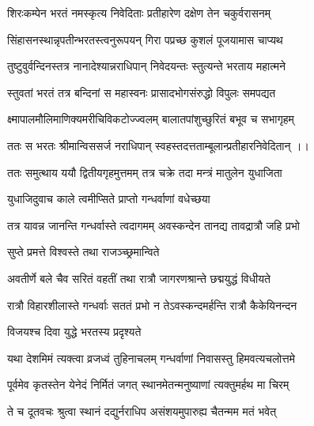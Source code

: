 \twolineshloka
{शिरःकम्पेन भरतं नमस्कृत्य निवेदिताः}
{प्रतीहारेण दक्षेण तेन चकुर्वरासनम्}%

\twolineshloka
{सिंहासनस्थान्नृपतीन्भरतस्त्वनुरूपयन्}
{गिरा पप्रच्छ कुशलं पूजयामास चाप्यथ}%

\twolineshloka
{तुष्टुवुर्वन्दिनस्तत्र नानादेश्यान्नराधिपान्}
{निवेदयन्तः स्तुत्यन्ते भरताय महात्मने}%

\twolineshloka
{स्तुवतां भरतं तत्र बन्दिनां स महास्वनः}
{प्रासादभोगसंरुद्धो विपुलः समपद्यत}%

\twolineshloka
{क्ष्मापालमौलिमाणिक्यमरीचिविकटोज्ज्वलम्}
{बालातपांशुच्छुरितं बभूव च सभागृहम्}%

\twolineshloka
{ततः स भरतः श्रीमान्विससर्ज नराधिपान्}
{स्वहस्तदत्तताम्बूलान्प्रतीहारनिवेदितान् ।।}%

\twolineshloka
{ततः समुत्थाय ययौ द्वितीयगृहमुत्तमम्}
{तत्र चक्रे तदा मन्त्रं मातुलेन युधाजिता}%


{युधाजिदुवाच}
\onelineshloka
{काले त्वमीप्सिते प्राप्तो गन्धर्वाणां वधेच्छया}%

\twolineshloka
{तत्र यावन्न जानन्ति गन्धर्वास्ते त्वदागमम्}
{अवस्कन्देन तानद्य तावद्रात्रौ जहि प्रभो}%



\onelineshloka
{सुप्ते प्रमत्ते विश्वस्ते तथा राजञ्च्छ्रमान्विते}%

\twolineshloka
{अवतीर्णे बले चैव सरितं वहतीं तथा}
{रात्रौ जागरणश्रान्ते छद्मयुद्धं विधीयते}%

\twolineshloka
{रात्रौ विहारशीलास्ते गन्धर्वाः सततं प्रभो}
{न तेऽवस्कन्दमर्हन्ति रात्रौ कैकेयिनन्दन}%

\onelineshloka
{विजयश्च दिवा युद्धे भरतस्य प्रदृश्यते}



\twolineshloka
{यथा देशमिमं त्यक्त्वा व्रजध्वं तुहिनाचलम्}
{गन्धर्वाणां निवासस्तु हिमवत्यचलोत्तमे}%

\twolineshloka
{पूर्वमेव कृतस्तेन येनेदं निर्मितं जगत्}
{स्थानमेतन्मनुष्याणां त्यक्तुमर्हथ मा चिरम्}%

\twolineshloka
{ते च दूतवचः श्रुत्वा स्थानं दद्युर्नराधिप}
{असंशयमुपारुह्य चैतन्मम मतं भवेत्}%

